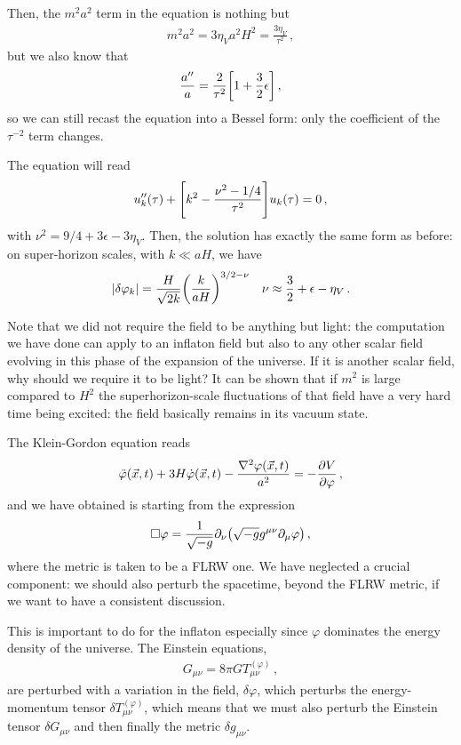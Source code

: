 \documentclass[main.tex]{subfiles}
\begin{document}
Then, the \(m^2 a^2\) term in the equation is nothing but 
%
\begin{align}
m^2 a^2 = 3 \eta _V a^2 H^2 = \frac{3 \eta _V}{\tau^2}
\,,
\end{align}
%
but we also know that 
%
\begin{align}
\frac{a''}{a} = \frac{2}{\tau^2 } \qty[ 1 + \frac{3}{2} \epsilon ]
\,,
\end{align}
%
so we can still recast the equation into a Bessel form: only the coefficient of the \(\tau^{-2}\) term changes. 

The equation will read 
%
\begin{align}
u''_k (\tau ) + \qty[ k^2 - \frac{\nu^2 - 1/4}{\tau^2}] u_k (\tau ) = 0
\,,
\end{align}
%
with \(\nu^2 = 9/4 + 3 \epsilon - 3 \eta _V\). 
Then, the solution has exactly the same form as before: on super-horizon scales, with \(k \ll aH\), we have
%
\begin{align}
\abs{ \delta \varphi _k} = \frac{H}{\sqrt{2 k}} \qty( \frac{k}{aH})^{3/2 - \nu }
&&
\nu \approx \frac{3}{2} + \epsilon - \eta _V
\,.
\end{align}

Note that we did not require the field to be anything but light: the computation we have done can apply to an inflaton field but also to any other scalar field evolving in this phase of the expansion of the universe. 
If it is another scalar field, why should we require it to be light? It can be shown that if \(m^2\) is large compared to \(H^2\) the superhorizon-scale fluctuations of that field have a very hard time being excited: the field basically remains in its vacuum state. 

The Klein-Gordon equation reads 
%
\begin{align}
\ddot{\varphi} (\vec{x}, t)
+ 3 H \dot{\varphi} (\vec{x}, t)
- \frac{\nabla^2 \varphi (\vec{x},t)}{a^2}
= - \pdv{V}{\varphi }
\,,
\end{align}
%
and we have obtained is starting from the expression 
%
\begin{align}
\square \varphi = \frac{1}{\sqrt{-g}} \partial_{\nu } \qty(\sqrt{-g} g^{\mu \nu } \partial_{\mu } \varphi )
\,,
\end{align}
%
where the metric is taken to be a FLRW one. We have neglected a crucial component: we should also perturb the spacetime, beyond the FLRW metric, if we want to have a consistent discussion. 

This is important to do for the inflaton especially since \(\varphi \) dominates the energy density of the universe. 
The Einstein equations, 
%
\begin{align}
G_{\mu \nu } = 8 \pi G T_{\mu \nu }^{(\varphi )}
\,,
\end{align}
%
are perturbed with a variation in the field, \(\delta \varphi \), which perturbs the energy-momentum tensor \(\delta T_{\mu \nu }^{(\varphi )}\), which means that we must also perturb the Einstein tensor \(\delta G_{\mu \nu} \) and then finally the metric \(\delta g_{\mu \nu }\). 
\end{document}
